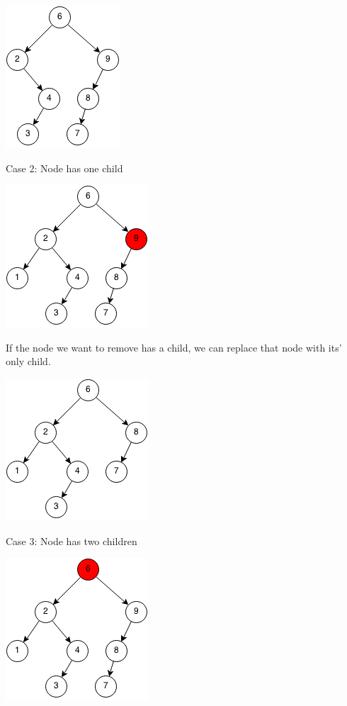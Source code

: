 \documentclass[11pt,oneside]{book}
\makeatletter
\def\maxwidth#1{\ifdim\Gin@nat@width>#1 #1\else\Gin@nat@width\fi}
\makeatother
\begin{document}
\vspace{5px}\includegraphics[width=\maxwidth{\textwidth}]{bst-rem-case12.png}

Case 2: Node has one child

\vspace{5px}\includegraphics[width=\maxwidth{\textwidth}]{bst-rem-case21.png}

If the node we want to remove has a child, we can replace that node with its' only child.

\vspace{5px}\includegraphics[width=\maxwidth{\textwidth}]{bst-rem-case22.png}

Case 3: Node has two children

\vspace{5px}\includegraphics[width=\maxwidth{\textwidth}]{bst-rem-case31.png}
\end{document}
